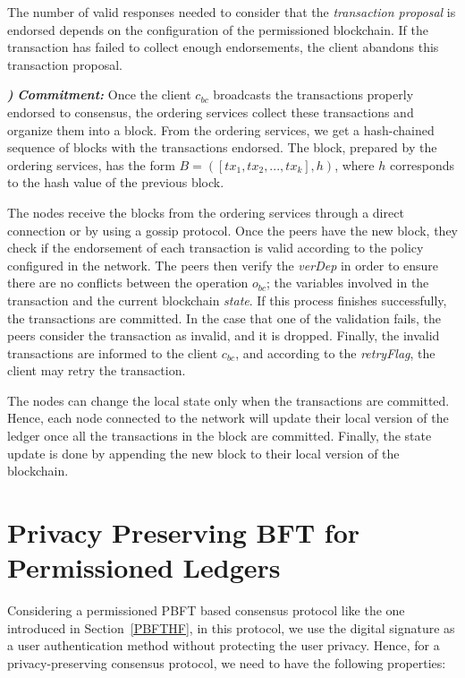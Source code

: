 \documentclass[conference]{llncs}
\newcounter{paranum}
\newcommand{\Par}{\vspace{10pt}\noindent\textbf{\refstepcounter{paranum}\theparanum}\textbf\textit) }
\begin{document}
The number of valid responses needed to consider that the \textit{transaction proposal} is endorsed depends on the configuration of the permissioned blockchain. If the transaction has failed to collect enough endorsements, the client abandons this transaction proposal.

\Par{\textit{\textbf{Commitment:}}} Once the client $c_{bc}$ broadcasts the transactions properly endorsed to consensus, the ordering services collect these transactions and organize them into a block. From the ordering services, we get a hash-chained sequence of blocks with the transactions endorsed. The block, prepared by the ordering services, has the form $B=\left(\left[tx_1,tx_2,...,tx_k\right],h\right)$, where $h$ corresponds to the hash value of the previous block.

The nodes receive the blocks from the ordering services through a direct connection or by using a gossip protocol. Once the peers have the new block, they check if the endorsement of each transaction is valid according to the policy configured in the network. The peers then verify the \textit{verDep} in order to ensure there are no conflicts between the operation $o_{bc}$; the variables involved in the transaction and the current blockchain \textit{state}. If this process finishes successfully, the transactions are committed. In the case that one of the validation fails, the peers consider the transaction as invalid, and it is dropped. Finally, the invalid transactions are informed to the client $c_{bc}$, and according to the \textit{retryFlag}, the client may retry the transaction.

The nodes can change the local state only when the transactions are committed. Hence, each node connected to the network will update their local version of the ledger once all the transactions in the block are committed. Finally, the state update is done by appending the new block to their local version of the blockchain.

\section{Privacy Preserving BFT for Permissioned Ledgers}\label{PPPBFT}

Considering a permissioned PBFT based consensus protocol like the one introduced in Section~\ref{PBFTHF}, in this protocol, we use the digital signature as a user authentication method without protecting the user privacy. Hence, for a privacy-preserving consensus protocol, we need to have the following properties:
\end{document}
